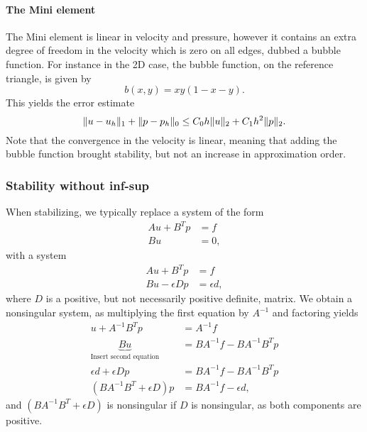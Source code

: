 \paragraph{The Mini element}
The Mini element is linear in velocity and pressure, however it contains an extra degree of freedom in the velocity which is zero on all edges, dubbed a bubble function.
For instance in the 2D case, the bubble function, on the reference triangle, is given by
\begin{equation}
    b(x, y) = xy(1 - x - y).
\end{equation}
This yields the error estimate
\begin{equation}
    \lVert u - u_h\rVert_1 + \lVert p - p_h\rVert_0
    \leq
    C_0 h \lVert u\rVert_2 + C_1 h^2 \lVert p\rVert_2.
\end{equation}
Note that the convergence in the velocity is linear, meaning that adding the bubble function brought stability, but not an increase in approximation order.

\subsubsection{Stability without inf-sup}
When stabilizing, we typically replace a system of the form
\begin{equation}
    \begin{split}
        Au + B^T p &= f \\
        B u &= 0,
    \end{split}
\end{equation}
with a system
\begin{equation}
    \begin{split}
        Au + B^T p &= f \\
        B u - \epsilon Dp &= \epsilon d,
    \end{split}
\end{equation}
where $D$ is a positive, but not necessarily positive definite, matrix.
We obtain a nonsingular system, as multiplying the first equation by $A^{-1}$ and factoring yields
\begin{equation}
    \begin{split}
        u + A^{-1} B^T p &= A^{-1} f \\
        \underbrace{B u}_{\text{Insert second equation}} &= B A^{-1} f - B A^{-1} B^T p \\
        \epsilon d + \epsilon D p &= B A^{-1} f - B A^{-1} B^T p \\
        (B A^{-1} B^T + \epsilon D)p &= BA^{-1} f - \epsilon d,
    \end{split}
\end{equation}
and $(B A^{-1} B^T + \epsilon D)$ is nonsingular if $D$ is nonsingular, as both components are positive.

